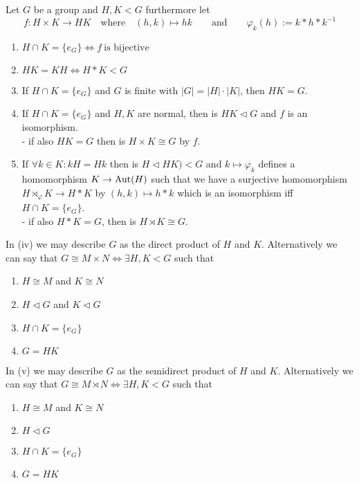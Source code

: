 \begin{proposition}\label{pro:dir_semidir_prod}
   Let \(G\) be a group and \(H, K < G\) furthermore let
   \[f: H \times K \to HK \quad\text{where}\quad (h,k) \mapsto hk \qquad\text{and}\qquad \varphi_k(h) := k \ast h \ast k^{-1}\]

   \begin{enumerate}[label=\roman*, align=Center]
      \item \(H \cap K = \{e_G\} \iff f~\text{is bijective}\)
      \item \(HK = KH \iff H \ast K < G\)
      \item If \(H \cap K = \{e_G\}\) and \(G\) is finite with \(|G| = |H| \cdot |K|\), then \(HK = G\).
      \item If \(H \cap K = \{e_G\}\) and \(H, K\) are normal, then is \(HK \triangleleft G\) and \(f\) is an isomorphism. \\
      - if also \(HK = G\) then is \(H \times K \cong G\) by \(f\).
      \item If \(\forall k \in K: kH = Hk\) then is \(H \triangleleft HK) < G\) and \(k \mapsto \varphi_k\) defines a homomorphism \(K \to \operatorname{Aut}(H)\) such that we have a surjective homomorphism \(H \rtimes_{\varphi} K \to H \ast K\) by \((h,k) \mapsto h \ast k\) which is an isomorphism iff \(H \cap K = \{e_G\}\). \\
      - if also \(H \ast K = G\), then is \(H \rtimes K \cong G\).
   \end{enumerate}
\end{proposition}
\begin{remark}
   In (iv) we may describe \(G\) as the direct product of \(H\) and \(K\).
   Alternatively we can say that
   \(G \cong M \times N \iff \exists H, K < G\) such that
   \begin{enumerate}[label=\roman*, align=Center]
      \item \(H \cong M\) and \(K \cong N\)
      \item \(H \triangleleft G\) and \(K \triangleleft G\)
      \item \(H \cap K = \{e_G\}\)
      \item \(G = HK\)
   \end{enumerate}

   In (v) we may describe \(G\) as the semidirect product of \(H\) and \(K\).
   Alternatively we can say that
   \(G \cong M \rtimes N \iff \exists H, K < G\) such that
   \begin{enumerate}[label=\roman*, align=Center]
      \item \(H \cong M\) and \(K \cong N\)
      \item \(H \triangleleft G\)
      \item \(H \cap K = \{e_G\}\)
      \item \(G = HK\)
   \end{enumerate}
\end{remark}

